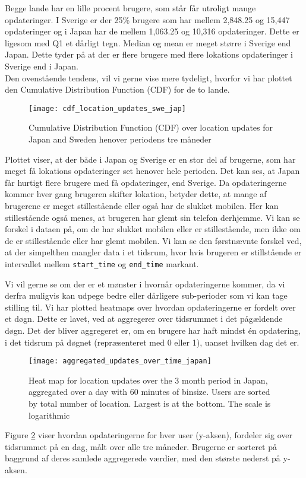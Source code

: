 Begge lande har en lille procent brugere, som står får utroligt mange opdateringer. I Sverige er der 25\% brugere som har mellem 2,848.25 og 15,447 opdateringer og i Japan har de mellem 1,063.25 og 10,316 opdateringer. Dette er ligesom med Q1 et dårligt tegn. 
Median og mean er meget større i Sverige end Japan. Dette tyder på at der er flere brugere med flere lokations opdateringer i Sverige end i Japan. \\


Den ovenstående tendens, vil vi gerne vise mere tydeligt, hvorfor vi har plottet den Cumulative Distribution Function (CDF) for de to lande. 
\begin{figure}[H]
    \hspace*{-1.0cm}
    \centering
    \texttt{[image: cdf\_location\_updates\_swe\_jap]}
    \caption{Cumulative Distribution Function (CDF) over location updates for Japan and Sweden henover periodens tre måneder}
    \label{fig:country_cdf}
\end{figure}

Plottet viser, at der både i Japan og Sverige er en stor del af brugerne, som har meget få lokations opdateringer set henover hele perioden. Det kan ses, at Japan får hurtigt flere brugere med få opdateringer, end Sverige. 
Da opdateringerne kommer hver gang brugeren skifter lokation, betyder dette, at mange af brugerene er meget stillestående eller også har de slukket mobilen. Her kan stillestående også menes, at brugeren har glemt sin telefon derhjemme. Vi kan se forskel i dataen på, om de har slukket mobilen eller er stillestående, men ikke om de er stillestående eller har glemt mobilen. Vi kan se den førstnævnte forskel ved, at der simpelthen mangler data i et tidsrum, hvor hvis brugeren er stillstående er intervallet mellem \texttt{start\_time} og \texttt{end\_time} markant. 

Vi vil gerne se om der er et mønster i hvornår opdateringerne kommer, da vi derfra muligvis kan udpege bedre eller dårligere sub-perioder som vi kan tage stilling til.
Vi har plotted heatmaps over hvordan opdateringerne er fordelt over et døgn. Dette er lavet, ved at aggregerer over tidsrummet i det pågældende døgn. Det der bliver aggregeret er, om en brugere har haft mindst én opdatering, i det tidsrum på døgnet (repræsenteret med 0 eller 1), uanset hvilken dag det er.

\begin{figure}[H]
    \hspace*{-0.8cm}
    \centering
    \texttt{[image: aggregated\_updates\_over\_time\_japan]}
    \caption{Heat map for location updates over the 3 month period in Japan, aggregated over a day with 60 minutes of binsize. Users are sorted by total number of location. Largest is at the bottom. The scale is logarithmic}
    \label{fig:agg_heatmap_jap}
\end{figure}
Figure \ref{fig:agg_heatmap_jap} viser hvordan opdateringerne for hver user (y-aksen), fordeler sig over tidsrummet på en dag, målt over alle tre måneder. Brugerne er sorteret på baggrund af deres samlede aggregerede værdier, med den største nederst på y-aksen. 

